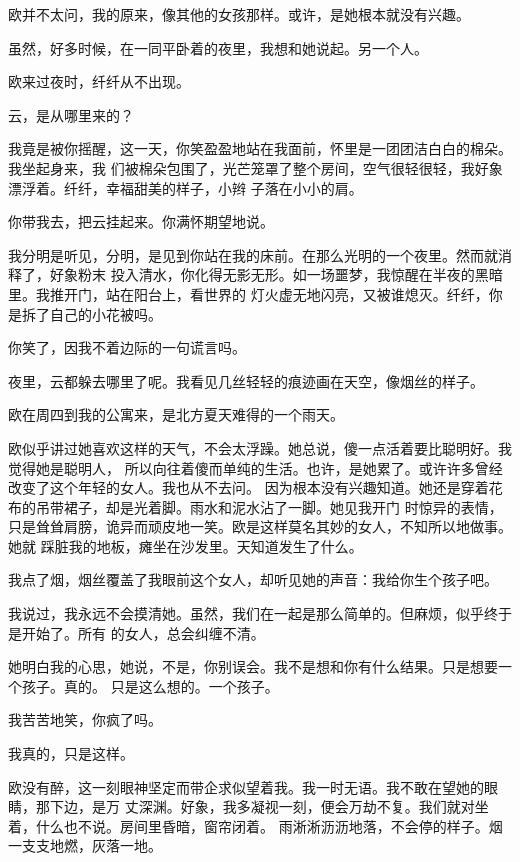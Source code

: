 		欧并不太问，我的原来，像其他的女孩那样。或许，是她根本就没有兴趣。\par
		虽然，好多时候，在一同平卧着的夜里，我想和她说起。另一个人。\par
		欧来过夜时，纤纤从不出现。\par
		云，是从哪里来的？

		我竟是被你摇醒，这一天，你笑盈盈地站在我面前，怀里是一团团洁白白的棉朵。我坐起身来，我
	们被棉朵包围了，光芒笼罩了整个房间，空气很轻很轻，我好象漂浮着。纤纤，幸福甜美的样子，小辫
	子落在小小的肩。

		你带我去，把云挂起来。你满怀期望地说。

		我分明是听见，分明，是见到你站在我的床前。在那么光明的一个夜里。然而就消释了，好象粉末
	投入清水，你化得无影无形。如一场噩梦，我惊醒在半夜的黑暗里。我推开门，站在阳台上，看世界的
	灯火虚无地闪亮，又被谁熄灭。纤纤，你是拆了自己的小花被吗。

		你笑了，因我不着边际的一句谎言吗。\par
		夜里，云都躲去哪里了呢。我看见几丝轻轻的痕迹画在天空，像烟丝的样子。


		欧在周四到我的公寓来，是北方夏天难得的一个雨天。

		欧似乎讲过她喜欢这样的天气，不会太浮躁。她总说，傻一点活着要比聪明好。我觉得她是聪明人，
	所以向往着傻而单纯的生活。也许，是她累了。或许许多曾经改变了这个年轻的女人。我也从不去问。
	因为根本没有兴趣知道。她还是穿着花布的吊带裙子，却是光着脚。雨水和泥水沾了一脚。她见我开门
	时惊异的表情，只是耸耸肩膀，诡异而顽皮地一笑。欧是这样莫名其妙的女人，不知所以地做事。她就
	踩脏我的地板，瘫坐在沙发里。天知道发生了什么。

		我点了烟，烟丝覆盖了我眼前这个女人，却听见她的声音：我给你生个孩子吧。

		我说过，我永远不会摸清她。虽然，我们在一起是那么简单的。但麻烦，似乎终于是开始了。所有
	的女人，总会纠缠不清。

		她明白我的心思，她说，不是，你别误会。我不是想和你有什么结果。只是想要一个孩子。真的。
	只是这么想的。一个孩子。

		我苦苦地笑，你疯了吗。\par
		我真的，只是这样。

		欧没有醉，这一刻眼神坚定而带企求似望着我。我一时无语。我不敢在望她的眼睛，那下边，是万
	丈深渊。好象，我多凝视一刻，便会万劫不复。我们就对坐着，什么也不说。房间里昏暗，窗帘闭着。
	雨淅淅沥沥地落，不会停的样子。烟一支支地燃，灰落一地。


